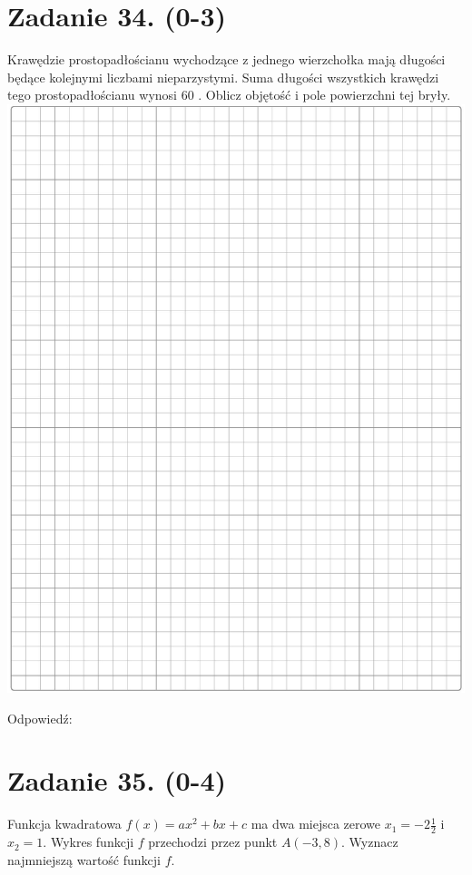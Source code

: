 \documentclass[10pt]{article}
\begin{document}
\section*{Zadanie 34. (0-3)}
Krawędzie prostopadłościanu wychodzące z jednego wierzchołka mają długości będące kolejnymi liczbami nieparzystymi. Suma długości wszystkich krawędzi tego prostopadłościanu wynosi 60 . Oblicz objętość i pole powierzchni tej bryły.\\
\includegraphics[max width=\textwidth, center]{2024_11_21_cdea326d19d0c2132b88g-17}

Odpowiedź: \(\qquad\)

\section*{Zadanie 35. (0-4)}
Funkcja kwadratowa \(f(x)=a x^{2}+b x+c\) ma dwa miejsca zerowe \(x_{1}=-2 \frac{1}{2}\) i \(x_{2}=1\). Wykres funkcji \(f\) przechodzi przez punkt \(A(-3,8)\). Wyznacz najmniejszą wartość funkcji \(f\).
\end{document}
